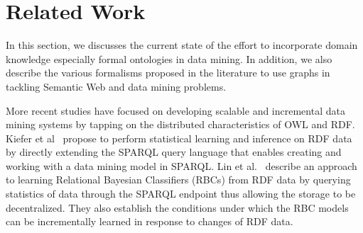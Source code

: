 \section{Related Work}
\label{sec:related}
In this section, we discusses the current state of the effort to incorporate domain knowledge especially formal ontologies in data mining. In addition, we also describe the various formalisms proposed in the literature to use graphs in tackling Semantic Web and data mining problems.




More recent studies have focused on developing scalable and incremental data mining systems by tapping on the distributed characteristics of OWL and RDF. Kiefer et al~\cite{Kiefer2008Adding} propose to perform statistical learning and inference on RDF data by directly extending the SPARQL query language that enables creating and working with a data mining model in SPARQL. Lin et al.~\cite{Lin2011Learning} describe an approach to learning Relational Bayesian Classifiers (RBCs) from RDF data by querying statistics of data through the SPARQL endpoint thus allowing the storage to be decentralized. They also establish the conditions under which the RBC models can be incrementally learned in response to changes of RDF data.

